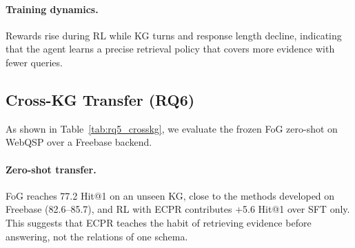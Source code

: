 \paragraph{Training dynamics.}
Rewards rise during RL while KG turns and response length decline, indicating that the agent learns a precise retrieval policy that covers more evidence with fewer queries.


\subsection{Cross-KG Transfer (RQ6)}
\label{sec:rq6}

As shown in Table~\ref{tab:rq5_crosskg}, we evaluate the frozen FoG zero-shot on WebQSP over a Freebase backend.

\paragraph{Zero-shot transfer.}
FoG reaches 77.2 Hit@1 on an unseen KG, close to the methods developed on Freebase (82.6--85.7), and RL with ECPR contributes +5.6 Hit@1 over SFT only. This suggests that ECPR teaches the habit of retrieving evidence before answering, not the relations of one schema.
